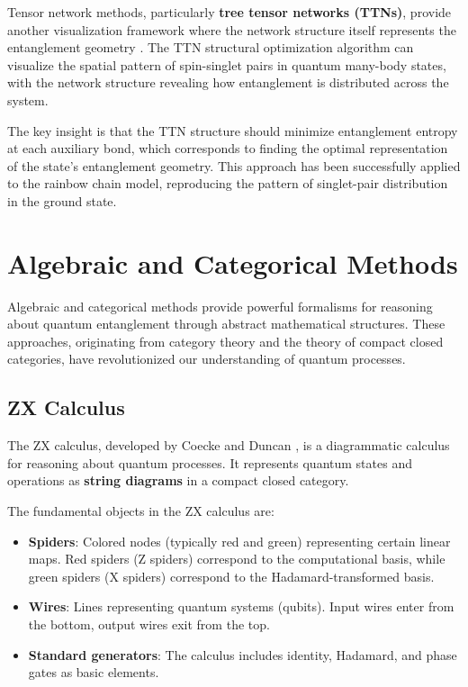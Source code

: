 \documentclass[12pt,a4paper]{article}
\begin{document}
Tensor network methods, particularly \textbf{tree tensor networks (TTNs)}, provide another visualization framework where the network structure itself represents the entanglement geometry \cite{Hikihara2024}. The TTN structural optimization algorithm can visualize the spatial pattern of spin-singlet pairs in quantum many-body states, with the network structure revealing how entanglement is distributed across the system.

The key insight is that the TTN structure should minimize entanglement entropy at each auxiliary bond, which corresponds to finding the optimal representation of the state's entanglement geometry. This approach has been successfully applied to the rainbow chain model, reproducing the pattern of singlet-pair distribution in the ground state.

\section{Algebraic and Categorical Methods}
\label{sec:algebraic}

Algebraic and categorical methods provide powerful formalisms for reasoning about quantum entanglement through abstract mathematical structures. These approaches, originating from category theory and the theory of compact closed categories, have revolutionized our understanding of quantum processes.

\subsection{ZX Calculus}
\label{sec:zx}

The ZX calculus, developed by Coecke and Duncan \cite{cqm,coecke2008interacting,zx-calculus}, is a diagrammatic calculus for reasoning about quantum processes. It represents quantum states and operations as \textbf{string diagrams} in a compact closed category.

The fundamental objects in the ZX calculus are:
\begin{itemize}
	\item \textbf{Spiders}: Colored nodes (typically red and green) representing certain linear maps. Red spiders (Z spiders) correspond to the computational basis, while green spiders (X spiders) correspond to the Hadamard-transformed basis.
	\item \textbf{Wires}: Lines representing quantum systems (qubits). Input wires enter from the bottom, output wires exit from the top.
	\item \textbf{Standard generators}: The calculus includes identity, Hadamard, and phase gates as basic elements.
\end{itemize}
\end{document}
